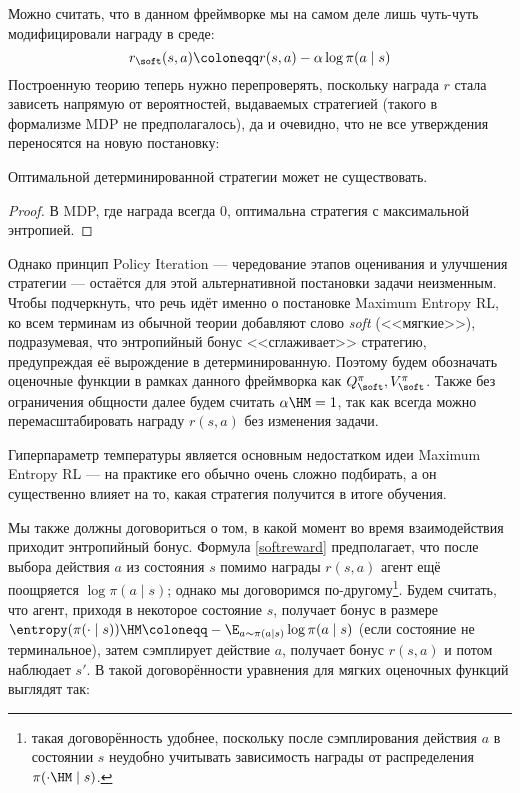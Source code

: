 Можно считать, что в данном фреймворке мы на самом деле лишь чуть-чуть модифицировали награду в среде:
\begin{equation}\label{softreward}
r_{\soft}(s, a) \coloneqq r(s, a) - \alpha \log \pi(a \mid s)
\end{equation}
Построенную теорию теперь нужно перепроверять, поскольку награда $r$ стала зависеть напрямую от вероятностей, выдаваемых стратегией (такого в формализме MDP не предполагалось), да и очевидно, что не все утверждения переносятся на новую постановку:

\begin{proposition}
Оптимальной детерминированной стратегии может не существовать.
\begin{proof}
В MDP, где награда всегда 0, оптимальна стратегия с максимальной энтропией.
\end{proof}
\end{proposition}

Однако принцип Policy Iteration --- чередование этапов оценивания и улучшения стратегии --- остаётся для этой альтернативной постановки задачи неизменным. Чтобы подчеркнуть, что речь идёт именно о постановке Maximum Entropy RL, ко всем терминам из обычной теории добавляют слово \emph{soft} (<<мягкие>>), подразумевая, что энтропийный бонус <<сглаживает>> стратегию, предупреждая её вырождение в детерминированную. Поэтому будем обозначать оценочные функции в рамках данного фреймворка как $Q^\pi_{\soft}, V^\pi_{\soft}$. Также без ограничения общности далее будем считать $\alpha \HM= 1$, так как всегда можно перемасштабировать награду $r(s, a)$ без изменения задачи.

\begin{remark}
Гиперпараметр температуры является основным недостатком идеи Maximum Entropy RL --- на практике его обычно очень сложно подбирать, а он существенно влияет на то, какая стратегия получится в итоге обучения.
\end{remark}

Мы также должны договориться о том, в какой момент во время взаимодействия приходит энтропийный бонус. Формула \eqref{softreward} предполагает, что после выбора действия $a$ из состояния $s$ помимо награды $r(s, a)$ агент ещё поощряется $\log \pi(a \mid s)$; однако мы договоримся по-другому\footnote{такая договорённость удобнее, поскольку после сэмплирования действия $a$ в состоянии $s$ неудобно учитывать зависимость награды от распределения $\pi(\cdot \HM\mid s)$.}. Будем считать, что агент, приходя в некоторое состояние $s$, получает бонус в размере $\entropy(\pi(\cdot \mid s)) \HM\coloneqq - \E_{a \sim \pi(a \mid s)} \log \pi(a \mid s)$ (если состояние не терминальное), затем сэмплирует действие $a$, получает бонус $r(s, a)$ и потом наблюдает $s'$. В такой договорённости уравнения для мягких оценочных функций выглядят так:

